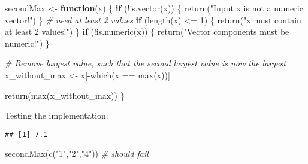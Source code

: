 \documentclass[
]{article}
\newenvironment{Shaded}{\begin{snugshade}}{\end{snugshade}}
\newcommand{\CommentTok}[1]{\textcolor[rgb]{0.56,0.35,0.01}{\textit{#1}}}
\newcommand{\ControlFlowTok}[1]{\textcolor[rgb]{0.13,0.29,0.53}{\textbf{#1}}}
\newcommand{\DecValTok}[1]{\textcolor[rgb]{0.00,0.00,0.81}{#1}}
\newcommand{\FunctionTok}[1]{\textcolor[rgb]{0.00,0.00,0.00}{#1}}
\newcommand{\NormalTok}[1]{#1}
\newcommand{\OtherTok}[1]{\textcolor[rgb]{0.56,0.35,0.01}{#1}}
\newcommand{\SpecialCharTok}[1]{\textcolor[rgb]{0.00,0.00,0.00}{#1}}
\newcommand{\StringTok}[1]{\textcolor[rgb]{0.31,0.60,0.02}{#1}}
\begin{document}
\begin{Shaded}
\begin{Highlighting}[]
\NormalTok{secondMax }\OtherTok{\textless{}{-}} \ControlFlowTok{function}\NormalTok{(x)}
\NormalTok{\{}
    \ControlFlowTok{if}\NormalTok{ (}\SpecialCharTok{!}\FunctionTok{is.vector}\NormalTok{(x))  \{}
        \FunctionTok{return}\NormalTok{(}\StringTok{"Input x is not a numeric vector!"}\NormalTok{)}
\NormalTok{    \}}
    \CommentTok{\# need at least 2 values}
    \ControlFlowTok{if}\NormalTok{ (}\FunctionTok{length}\NormalTok{(x) }\SpecialCharTok{\textless{}=} \DecValTok{1}\NormalTok{)     \{}
        \FunctionTok{return}\NormalTok{(}\StringTok{"x must contain at least 2 values!"}\NormalTok{)}
\NormalTok{    \}}
    \ControlFlowTok{if}\NormalTok{ (}\SpecialCharTok{!}\FunctionTok{is.numeric}\NormalTok{(x)) \{}
        \FunctionTok{return}\NormalTok{(}\StringTok{"Vector components must be numeric!"}\NormalTok{)}
\NormalTok{    \}}
    
    \CommentTok{\# Remove largest value, such that the second largest value is now the largest}
\NormalTok{    x\_without\_max }\OtherTok{\textless{}{-}}\NormalTok{ x[}\SpecialCharTok{{-}}\FunctionTok{which}\NormalTok{(x }\SpecialCharTok{==} \FunctionTok{max}\NormalTok{(x))]}
    
    \FunctionTok{return}\NormalTok{(}\FunctionTok{max}\NormalTok{(x\_without\_max))}
\NormalTok{\}}
\end{Highlighting}
\end{Shaded}

Testing the implementation:

\begin{Shaded}
\end{Shaded}

\begin{verbatim}
## [1] 7.1
\end{verbatim}

\begin{Shaded}
\begin{Highlighting}[]
\FunctionTok{secondMax}\NormalTok{(}\FunctionTok{c}\NormalTok{(}\StringTok{"1"}\NormalTok{,}\StringTok{"2"}\NormalTok{,}\StringTok{"4"}\NormalTok{)) }\CommentTok{\# should fail}
\end{Highlighting}
\end{Shaded}
\end{document}
